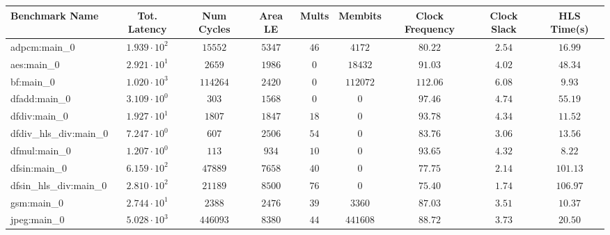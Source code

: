 \begin{tabular}{|l|c|c|c|c|c|c|c|c|}
\hline
Benchmark Name          & Tot. Latency           & Num Cycles & Area LE   & Mults   & Membits    & Clock Frequency & Clock Slack & HLS Time(s) \\
\hline
adpcm:main\_0           & $ 1.939 \cdot 10^{2} $ & $ 15552  $ & $ 5347  $ & $ 46  $ & $ 4172   $ & $ 80.22       $ & $ 2.54    $ & $ 16.99   $ \\
aes:main\_0             & $ 2.921 \cdot 10^{1} $ & $ 2659   $ & $ 1986  $ & $ 0   $ & $ 18432  $ & $ 91.03       $ & $ 4.02    $ & $ 48.34   $ \\
bf:main\_0              & $ 1.020 \cdot 10^{3} $ & $ 114264 $ & $ 2420  $ & $ 0   $ & $ 112072 $ & $ 112.06      $ & $ 6.08    $ & $ 9.93    $ \\
dfadd:main\_0           & $ 3.109 \cdot 10^{0} $ & $ 303    $ & $ 1568  $ & $ 0   $ & $ 0      $ & $ 97.46       $ & $ 4.74    $ & $ 55.19   $ \\
dfdiv:main\_0           & $ 1.927 \cdot 10^{1} $ & $ 1807   $ & $ 1847  $ & $ 18  $ & $ 0      $ & $ 93.78       $ & $ 4.34    $ & $ 11.52   $ \\
dfdiv\_hls\_div:main\_0 & $ 7.247 \cdot 10^{0} $ & $ 607    $ & $ 2506  $ & $ 54  $ & $ 0      $ & $ 83.76       $ & $ 3.06    $ & $ 13.56   $ \\
dfmul:main\_0           & $ 1.207 \cdot 10^{0} $ & $ 113    $ & $ 934   $ & $ 10  $ & $ 0      $ & $ 93.65       $ & $ 4.32    $ & $ 8.22    $ \\
dfsin:main\_0           & $ 6.159 \cdot 10^{2} $ & $ 47889  $ & $ 7658  $ & $ 40  $ & $ 0      $ & $ 77.75       $ & $ 2.14    $ & $ 101.13  $ \\
dfsin\_hls\_div:main\_0 & $ 2.810 \cdot 10^{2} $ & $ 21189  $ & $ 8500  $ & $ 76  $ & $ 0      $ & $ 75.40       $ & $ 1.74    $ & $ 106.97  $ \\
gsm:main\_0             & $ 2.744 \cdot 10^{1} $ & $ 2388   $ & $ 2476  $ & $ 39  $ & $ 3360   $ & $ 87.03       $ & $ 3.51    $ & $ 10.37   $ \\
jpeg:main\_0            & $ 5.028 \cdot 10^{3} $ & $ 446093 $ & $ 8380  $ & $ 44  $ & $ 441608 $ & $ 88.72       $ & $ 3.73    $ & $ 20.50   $ \\

\end{tabular}
